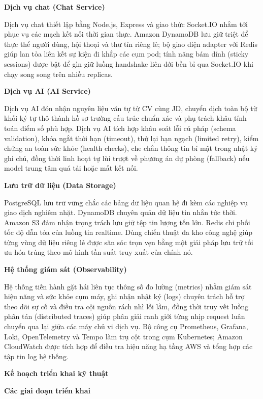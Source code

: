 \textbf{Dịch vụ chat (Chat Service)}

Dịch vụ chat thiết lập bằng Node.js, Express và giao thức Socket.IO nhắm
tới phục vụ các mạch kết nối thời gian thực. Amazon DynamoDB lưu giữ
triệt để thực thể người dùng, hội thoại và thư tín riêng lẻ; bộ giao
diện adapter với Redis giúp lan tỏa liên kết sự kiện đi khắp các cụm
pod; tính năng bám dính (sticky sessions) được bật để gìn giữ luồng
handshake liên đới bền bỉ qua Socket.IO khi chạy song song trên nhiều
replicas.

\textbf{Dịch vụ AI (AI Service)}

Dịch vụ AI đón nhận nguyên liệu văn tự từ CV cùng JD, chuyển dịch toàn
bộ từ khối ký tự thô thành hồ sơ trường cấu trúc chuẩn xác và phụ trách
khâu tính toán điểm số phù hợp. Dịch vụ AI tích hợp khâu soát lỗi cú
pháp (schema validation), khóa ngắt thời hạn (timeout), thử lại hạn
ngạch (limited retry), kiểm chứng an toàn sức khỏe (health checks), che
chắn thông tin bí mật trong nhật ký ghi chú, đồng thời linh hoạt tự lùi
trượt về phương án dự phòng (fallback) nếu model trung tâm quá tải hoặc
mất kết nối.

\textbf{Lưu trữ dữ liệu (Data Storage)}

PostgreSQL lưu trữ vững chắc các bảng dữ liệu quan hệ đi kèm các nghiệp
vụ giao dịch nghiêm nhặt. DynamoDB chuyên quản dữ liệu tin nhắn tức
thời. Amazon S3 đảm nhận trọng trách lưu giữ tệp tin lượng tốn lớn.
Redis chi phối tốc độ dẫn tỏa của luồng tin realtime. Dùng chiến thuật
đa kho công nghệ giúp từng vùng dữ liệu riêng lẻ được săn sóc trọn vẹn
bằng một giải pháp lưu trữ tối ưu hóa trúng theo mô hình tần suất truy
xuất của chính nó.

\textbf{Hệ thống giám sát (Observability)}

Hệ thống tiến hành gặt hái liên tục thông số đo lường (metrics) nhằm
giám sát hiệu năng và sức khỏe cụm máy, ghi nhận nhật ký (logs) chuyên
trách hỗ trợ theo dõi sự cố và điều tra cội nguồn rách nhì lỗi lầm, đồng
thời truy vết luồng phân tán (distributed traces) giúp phân giải ranh
giới từng nhịp request luân chuyển qua lại giữa các máy chủ vi dịch vụ.
Bộ công cụ Prometheus, Grafana, Loki, OpenTelemetry và Tempo làm trụ cột
trong cụm Kubernetes; Amazon CloudWatch được tích hợp để điều tra hiệu
năng hạ tầng AWS và tổng hợp các tập tin log hệ thống.

\vspace{0.5em}\noindent\textbf{Kế hoạch triển khai kỹ
thuật}\par

\vspace{0.5em}\noindent\textbf{Các giai đoạn triển
khai}\par

